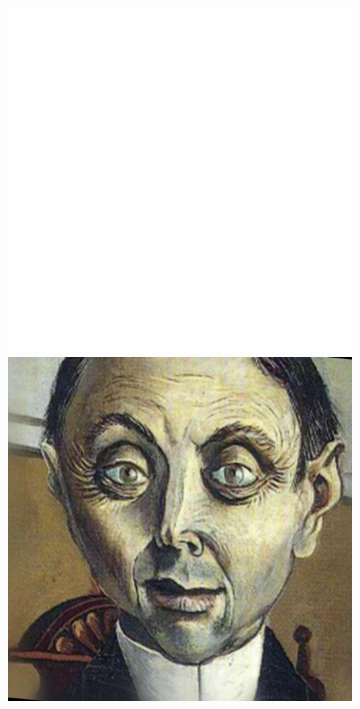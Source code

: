 \begin{figure}
    \centering
    \begin{subfigure}{0.22\linewidth}
        \includegraphics[width=\textwidth]{Figures/white.png}
        \includegraphics[width=\textwidth]{Figures/failed/stross/textures/00016_style.jpg}

\end{subfigure}
\end{figure}
